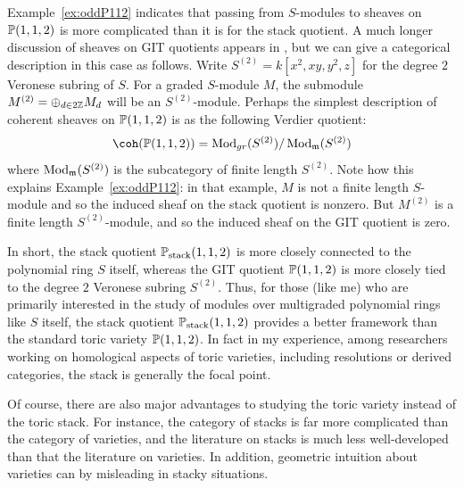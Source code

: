 \documentclass{amsart}
\begin{document}
Example~\ref{ex:oddP112} indicates that passing from $S$-modules to sheaves on $\mathbb P(1,1,2)$ is more complicated than it is for the stack quotient.  A much longer discussion of sheaves on GIT quotients appears in \cite[Chapter 5]{CLS}, but we can give a categorical description in this case as follows.  Write $S^{(2)}=k[x^2,xy,y^2,z]$ for the degree $2$ Veronese subring of $S$.  For a graded $S$-module $M$, the submodule $M^{(2)} = \oplus_{d \in 2\mathbb Z} M_d$ will be an $S^{(2)}$-module.  Perhaps the simplest description of coherent sheaves on $\mathbb P(1,1,2)$ is as the following Verdier quotient:
\[
\coh(\PP(1,1,2)) = \Mod_{gr}(S^{(2)}) / \Mod_{\mathfrak m}(S^{(2)})
\]
where $\operatorname{Mod}_{\mathfrak m}(S^{(2)})$ is the subcategory of finite length $S^{(2)}$.  Note how this explains Example~\ref{ex:oddP112}: in that example, $M$ is not a finite length $S$-module and so the induced sheaf on the stack quotient is nonzero.  But $M^{(2)}$ is a finite length $S^{(2)}$-module, and so the induced sheaf on the GIT quotient is zero.

In short, the stack quotient $\mathbb P_{\text{stack}}(1,1,2)$ is more closely connected to the polynomial ring $S$ itself, whereas the GIT quotient $\mathbb P(1,1,2)$ is more closely tied to the degree $2$ Veronese subring $S^{(2)}$.   Thus, for those (like me) who are primarily interested in the study of modules over multigraded polynomial rings like $S$ itself, the stack quotient $\mathbb P_{\text{stack}}(1,1,2)$ provides a better framework than the standard toric variety $\mathbb P(1,1,2)$.  In fact in my experience, among researchers working on homological aspects of toric varieties, including resolutions or derived categories, the stack is generally the focal point.


Of course, there are also major advantages to studying the toric variety instead of the toric stack.  For instance, the category of stacks is far more complicated than the category of varieties, and the literature on stacks is much less well-developed than that the literature on varieties.  In addition, geometric intuition about varieties can by misleading in stacky situations.
%

\end{document}
